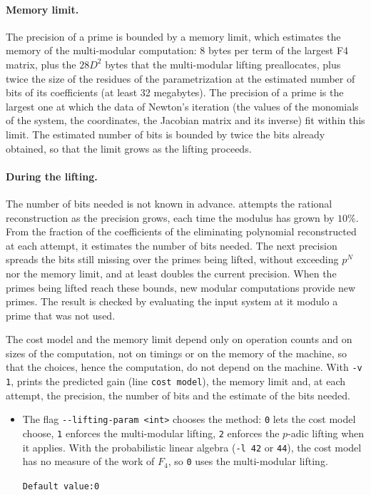 \documentclass[a4paper,english,11pt]{scrartcl}
\theoremstyle{definition}
\theoremstyle{remark}
\begin{document}
\paragraph{Memory limit.} The precision of a prime is bounded by a memory
limit, which estimates the memory of the multi-modular computation: 8
bytes per term of the largest F4 matrix, plus the $28 D^2$ bytes that the
multi-modular lifting preallocates, plus twice the size of the residues of
the parametrization at the estimated number of bits of its coefficients
(at least 32 megabytes). The precision of a prime is the largest one at
which the data of Newton's iteration (the values of the monomials of the
system, the coordinates, the Jacobian matrix and its inverse) fit within
this limit. The estimated number of bits is bounded by twice the bits
already obtained, so that the limit grows as the lifting proceeds.

\paragraph{During the lifting.} The number of bits needed is not known in
advance. \msolve attempts the rational reconstruction as the precision
grows, each time the modulus has grown by $10\%$. From the fraction of the
coefficients of the eliminating polynomial reconstructed at each attempt,
it estimates the number of bits needed. The next precision spreads the
bits still missing over the primes being lifted, without exceeding $p^N$
nor the memory limit, and at least doubles the current precision. When
the primes being lifted reach these bounds, new modular computations
provide new primes. The result is checked by evaluating the input system
at it modulo a prime that was not used.

The cost model and the memory limit depend only on operation counts and on
sizes of the computation, not on timings or on the memory of the machine,
so that the choices, hence the computation, do not depend on the machine.
With \verb+-v 1+, \msolve prints the predicted gain (line \verb+cost model+),
the memory limit and, at each attempt, the precision, the number of bits and
the estimate of the bits needed.

\begin{itemize}
\item The flag \verb+--lifting-param <int>+ chooses the method: \verb+0+
  lets the cost model choose, \verb+1+ enforces the multi-modular lifting,
  \verb+2+ enforces the $p$-adic lifting when it applies. With the probabilistic
  linear algebra (\verb+-l 42+ or \verb+44+), the cost model has
  no measure of the work of $F_4$, so \verb+0+ uses the multi-modular
  lifting.

  \hfill \verb+Default value:0+
\end{itemize}
\end{document}
